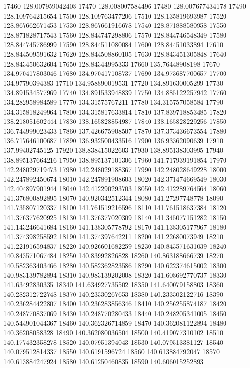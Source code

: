 {17460 128.007959042408
17470 128.008007584496
17480 128.007677434178
17490 128.109764215654
17500 128.109763477206
17510 128.135819693987
17520 128.867662671453
17530 128.867661916678
17540 128.871888580958
17550 128.871828717543
17560 128.844747298806
17570 128.844746548349
17580 128.844745786999
17590 128.844511080084
17600 128.84451033894
17610 128.844509591632
17620 128.844508860105
17630 128.843451305848
17640 128.843450632604
17650 128.84344995333
17660 135.76448908198
17670 134.970417803046
17680 134.970417108737
17690 134.973687700657
17700 134.97790394383
17710 134.958890019531
17720 134.891630005299
17730 134.891534577969
17740 134.891533948839
17750 134.885122257942
17760 134.282958984589
17770 134.31575767211
17780 134.315757058584
17790 134.315818249964
17800 134.315817633814
17810 137.839718853485
17820 138.218051602444
17830 138.165828854987
17840 138.165828229256
17850 136.744999023433
17860 137.426675908507
17870 137.373436673554
17880 136.717646100687
17890 136.932500433516
17900 136.93362090639
17910 137.99402745125
17920 138.838415022603
17930 138.895138303995
17940 138.895137664216
17950 138.895137101306
17960 141.717939191854
17970 142.248029719473
17980 142.248029188367
17990 142.248028649228
18000 142.247892450674
18010 142.247891908603
18020 142.371474669549
18030 142.404897901944
18040 142.412290293703
18050 142.412289764564
18060 141.376800892895
18070 140.920342512344
18080 141.27297748778
18090 141.735807120337
18100 141.761519216596
18110 141.761518637384
18120 141.376377620925
18130 141.376377020309
18140 141.345077151282
18150 141.143246641684
18160 141.138305778792
18170 141.138305177967
18180 141.374398258592
18190 141.374397642211
18200 141.22680073949
18210 141.221916594837
18220 140.926601682259
18230 140.843571631039
18240 140.843571067484
18250 140.83992826828
18260 140.863188666739
18270 140.582363403466
18280 140.582362823586
18290 140.622374615002
18300 140.983139782894
18310 140.983139202008
18320 141.608692770737
18330 141.63492830335
18340 141.634927735502
18350 141.640079158803
18360 140.282312722748
18370 140.23330267653
18380 140.233302122716
18390 140.236284422807
18400 140.236283856346
18410 140.256255874187
18420 140.248770837069
18430 140.248770280433
18440 140.248205341005
18450 140.544901044367
18460 140.362326714859
18470 140.362081122894
18480 140.36208058328
18490 140.362080036504
18500 140.419077310102
18510 140.177432358278
18520 140.07951394043
18530 140.079513381127
18540 140.079512814337
18550 140.6191596724
18560 140.613884792047
18570 140.613884247924
18580 140.61250460835
18590 140.606015252893
}
